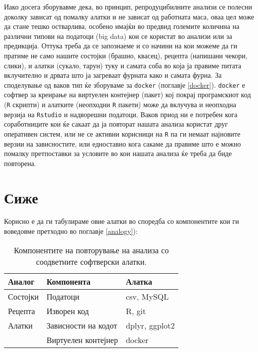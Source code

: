 \documentclass[
]{book}
\begin{document}
Иако досега зборувавме дека, во принцип, репродуцибилните анализи се полесни доколку зависат од помалку алатки и не зависат од работната маса, оваа цел може да стане тешко остварлива, особено имајќи во предвид големите количина на различни типови на податоци (big data) кои се користат во анализи или за предикција. Оттука треба да се запознаеме и со начини на кои можеме да ги пратиме не само нашите состојки (брашно, квасец), рецепта (напишани чекори, слики), и алатки (сукало, тарун) туку и самата соба во која ја правиме питата вклучително и дрвата што ја загреваат фурната како и самата фурна. За споделување од ваков тип ќе зборуваме за \texttt{docker} (поглавје \ref{docker}). \texttt{docker} е софтвер за креирање на виртуелен контејнер (пакет) кој покрај програмскиот код (\texttt{R} скрипти) и алатките (неопходни \texttt{R} пакети) може да вклучува и неопходна верзија на \texttt{Rstudio} и надворешни податоци. Ваков приод ни е потребен кога соработниците кои ќе сакаат да ја повторат нашата анализа користат друг оперативен систем, или не се активни корисници на \texttt{R} па ги немаат најновите верзии на зависностите, или едноставно кога сакаме да правиме што е можно помалку претпоставки за условите во кои нашата анализа ќе треба да биде повторена.

\hypertarget{ux441ux438ux436ux435}{%
\section{Сиже}\label{ux441ux438ux436ux435}}

Корисно е да ги табулираме овие алатки во споредба со компонентите кои ги воведовме претходно во поглавје \ref{analogy}):

\begin{table}

\caption{\label{tab:unnamed-chunk-1}Компонентите на повторување на анализа со соодветните софтверски алатки.}
\centering
\begin{tabular}[t]{l|l|l}
\hline
Аналог & Компонента & Алатка\\
\hline
Состојки & Податоци & csv, MySQL\\
\hline
Рецепта & Изворен код & R, git\\
\hline
Алатки & Зависности на кодот & dplyr, ggplot2\\
\hline
 & Виртуелен контејнер & docker\\
\hline
\end{tabular}
\end{table}
\end{document}
